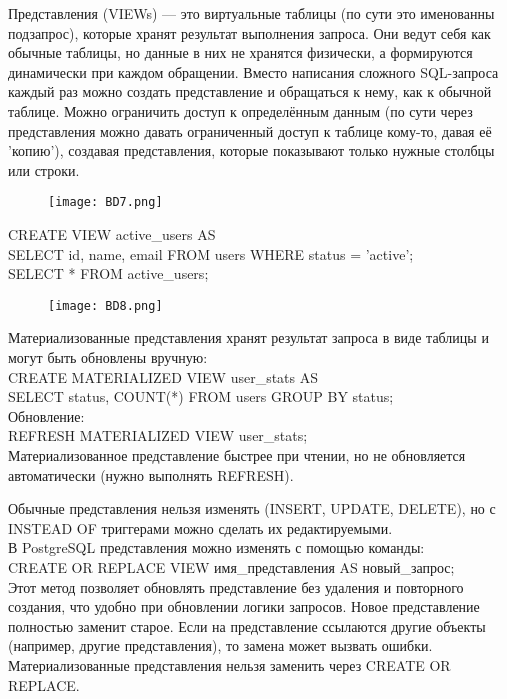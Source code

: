 \noindent Представления (VIEWs) — это виртуальные таблицы (по сути это именованны подзапрос), которые хранят результат выполнения запроса. Они ведут себя как обычные таблицы, но данные в них не хранятся физически, а формируются динамически при каждом обращении. Вместо написания сложного SQL-запроса каждый раз можно создать представление и обращаться к нему, как к обычной таблице. Можно ограничить доступ к определённым данным (по сути через представления можно давать ограниченный доступ к таблице кому-то, давая её 'копию'), создавая представления, которые показывают только нужные столбцы или строки.
\begin{figure}[H]
    \centering
    \texttt{[image: BD7.png]}
\end{figure}
\noindent CREATE VIEW active\_users AS \\
SELECT id, name, email FROM users WHERE status = 'active'; \\
SELECT * FROM active\_users;
\begin{figure}[H]
    \centering
    \texttt{[image: BD8.png]}
\end{figure}

\noindent Материализованные представления хранят результат запроса в виде таблицы и могут быть обновлены вручную: \\
CREATE MATERIALIZED VIEW user\_stats AS \\
SELECT status, COUNT(*) FROM users GROUP BY status; \\
Обновление: \\
REFRESH MATERIALIZED VIEW user\_stats; \\
Материализованное представление быстрее при чтении, но не обновляется автоматически (нужно выполнять REFRESH). 

\noindent Обычные представления нельзя изменять (INSERT, UPDATE, DELETE), но с INSTEAD OF триггерами можно сделать их редактируемыми. \\

\noindent В PostgreSQL представления можно изменять с помощью команды: \\
CREATE OR REPLACE VIEW имя\_представления AS новый\_запрос; \\
Этот метод позволяет обновлять представление без удаления и повторного создания, что удобно при обновлении логики запросов. Новое представление полностью заменит старое. Если на представление ссылаются другие объекты (например, другие представления), то замена может вызвать ошибки. Материализованные представления нельзя заменить через CREATE OR REPLACE. \\

